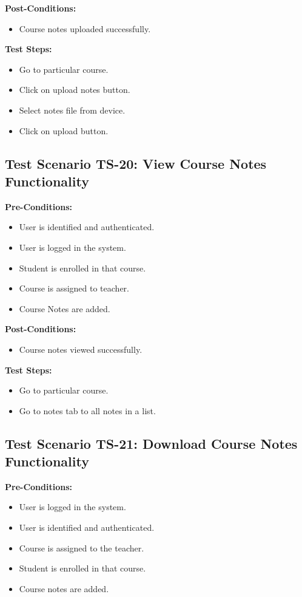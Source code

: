 \textbf{Post-Conditions: }
\begin{itemize}

\item Course notes uploaded successfully.

\end{itemize}
\textbf{Test Steps:}
\begin{itemize}

\item Go to particular course.
\item Click on upload notes button.
\item Select notes file from device.
\item Click on upload button.

\end{itemize}



\subsection{Test Scenario TS-20: View Course Notes Functionality}
\textbf{Pre-Conditions: }
\begin{itemize}

\item User is identified and authenticated.
\item User is logged in the system.
\item Student is enrolled in that course.
\item Course is assigned to teacher.
\item Course Notes are added.

\end{itemize}

\textbf{Post-Conditions: }
\begin{itemize}

\item Course notes viewed successfully.

\end{itemize}
\textbf{Test Steps:}
\begin{itemize}

\item Go to particular course.
\item Go to notes tab to all notes in a list.

\end{itemize}


\subsection{Test Scenario TS-21: Download Course Notes Functionality}
\textbf{Pre-Conditions: }
\begin{itemize}

\item User is logged in the system.
\item User is identified and authenticated.
\item Course is assigned to the teacher.
\item Student is enrolled in that course.
\item Course notes are added.

\end{itemize}

